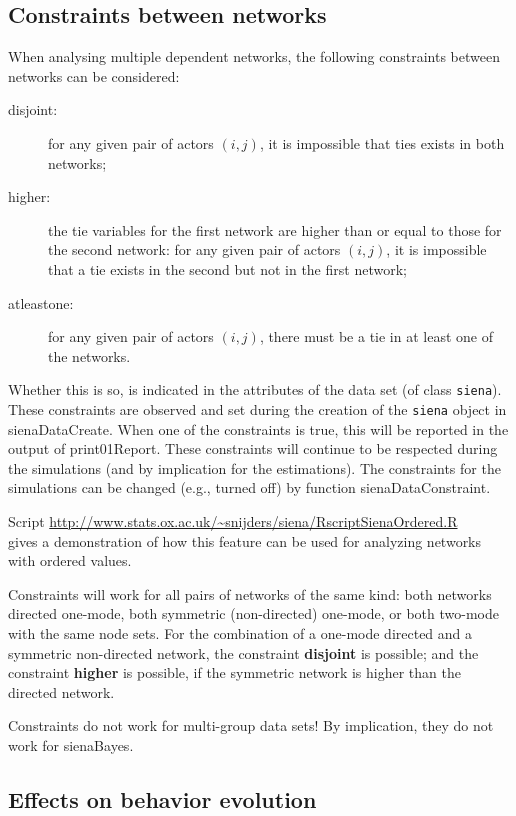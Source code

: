 \documentclass[a4paper,fleqn,11pt]{article}
\newcommand{\+}{\, + \,}
\newcommand{\sfn}[1]{\textsf{#1}}
\begin{document}
\subsection{Constraints between networks}
\label{S_constraints}

When analysing multiple dependent networks, the following constraints
between networks can be considered:
\begin{description}
  \item[disjoint:] for any given pair of actors $(i,j)$,
      it is impossible that ties exists in both networks;
  \item[higher:] the tie variables for the first network
      are higher than or equal to those for the second network:
      for any given pair of actors $(i,j)$,
      it is impossible that a tie exists in the second
      but not in the first network;
  \item[atleastone:] for any given pair of actors $(i,j)$,
     there must be a tie in at least one of the networks.
\end{description}
Whether this is so, is indicated in the attributes of the data set
(of class \texttt{siena}).
These constraints are observed and set during the creation of the
\texttt{siena} object in \sfn{sienaDataCreate}.
When one of the constraints is true,
this will be reported in the output of \sfn{print01Report}.
These constraints will continue to be respected during the simulations
(and by implication for the estimations).
The constraints for the simulations can be changed
(e.g., turned off) by function \sfn{sienaDataConstraint}.

Script \url{http://www.stats.ox.ac.uk/~snijders/siena/RscriptSienaOrdered.R}\\
gives a demonstration of how this feature can be used for analyzing networks
with ordered values.
\medskip

Constraints will work for all pairs of networks of the same kind:
both networks directed one-mode, both symmetric (non-directed) one-mode,
or both two-mode with the same node sets.
For the combination of a one-mode directed and a symmetric non-directed
network, the constraint \textbf{disjoint} is possible;
and the constraint \textbf{higher} is possible,
if the symmetric network is higher than the directed network.

Constraints do not work for multi-group data sets! By implication,
they do not work for \sfn{sienaBayes}.


\subsection{Effects on behavior evolution}
\label{S_eff_beh}
\end{document}
